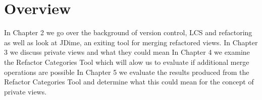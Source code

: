 % 
 

\section{Overview}
In Chapter 2 we go over the background of version control, LCS and refactoring as well as look at JDime, an exiting tool for merging refactored views.
In Chapter 3 we discuss private views and what they could mean
In Chapter 4 we examine the Refactor Categories Tool which will alow us to evaluate if additional merge operations are possible
In Chapter 5 we evaluate the results produced from the Refactor Categories Tool and determine what this could mean for the concept of private views. 

